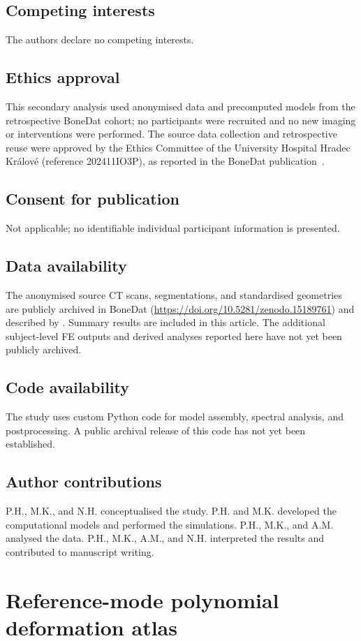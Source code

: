 \documentclass[pdflatex,sn-basic]{sn-jnl}
\begin{document}
\subsection*{Competing interests}
The authors declare no competing interests.
\subsection*{Ethics approval}
This secondary analysis used anonymised data and precomputed models from the retrospective BoneDat cohort; no participants were recruited and no new imaging or interventions were performed. The source data collection and retrospective reuse were approved by the Ethics Committee of the University Hospital Hradec Kr\'alov\'e (reference 202411IO3P), as reported in the BoneDat publication~\citep{HenyssKuchar2025BoneDat}.
\subsection*{Consent for publication}
Not applicable; no identifiable individual participant information is presented.
\subsection*{Data availability}
The anonymised source CT scans, segmentations, and standardised geometries are publicly archived in BoneDat (\url{https://doi.org/10.5281/zenodo.15189761}) and described by \citet{HenyssKuchar2025BoneDat}. Summary results are included in this article. The additional subject-level FE outputs and derived analyses reported here have not yet been publicly archived.
\subsection*{Code availability}
The study uses custom Python code for model assembly, spectral analysis, and postprocessing. A public archival release of this code has not yet been established.
\subsection*{Author contributions}
P.H., M.K., and N.H. conceptualised the study. P.H. and M.K. developed the computational models and performed the simulations. P.H., M.K., and A.M. analysed the data. P.H., M.K., A.M., and N.H. interpreted the results and contributed to manuscript writing.

\appendix
\section{Reference-mode polynomial deformation atlas}\label{app:atlas}
\end{document}
